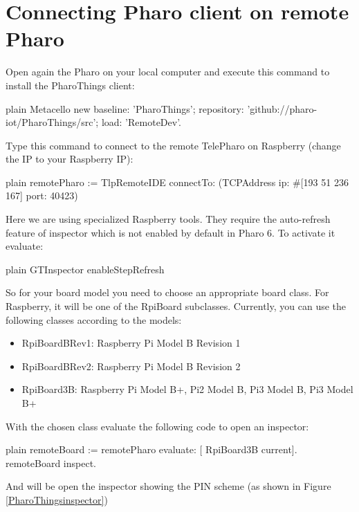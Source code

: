 \documentclass[10pt,twoside,english]{_support/latex/sbabook/sbabook}
\begin{document}
\section{Connecting Pharo client on remote Pharo}
Open again the Pharo on your local computer and execute this command to install the PharoThings client:

\begin{displaycode}{plain}
Metacello new
baseline: 'PharoThings';
repository: 'github://pharo-iot/PharoThings/src';
load: 'RemoteDev'.
\end{displaycode}

Type this command to connect to the remote TelePharo on Raspberry (change the IP to your Raspberry IP):

\begin{displaycode}{plain}
remotePharo := TlpRemoteIDE connectTo: (TCPAddress ip: #[193 51 236 167] port: 40423)
\end{displaycode}

Here we are using specialized Raspberry tools. They require the auto-refresh feature of inspector which is not enabled by default in Pharo 6. To activate it evaluate:

\begin{displaycode}{plain}
GTInspector enableStepRefresh
\end{displaycode}

So for your board model you need to choose an appropriate board class. For Raspberry, it will be one of the RpiBoard subclasses. Currently, you can use the following classes according to the models:

\begin{itemize}
\item RpiBoardBRev1: Raspberry Pi Model B Revision 1
\item RpiBoardBRev2: Raspberry Pi Model B Revision 2
\item RpiBoard3B: Raspberry Pi Model B+, Pi2 Model B, Pi3 Model B, Pi3 Model B+
\end{itemize}

With the chosen class evaluate the following code to open an inspector:

\begin{displaycode}{plain}
remoteBoard := remotePharo evaluate: [ RpiBoard3B current].
remoteBoard inspect.
\end{displaycode}

And will be open the inspector showing the PIN scheme (as shown in Figure \ref{PharoThingsinspector})
\end{document}
